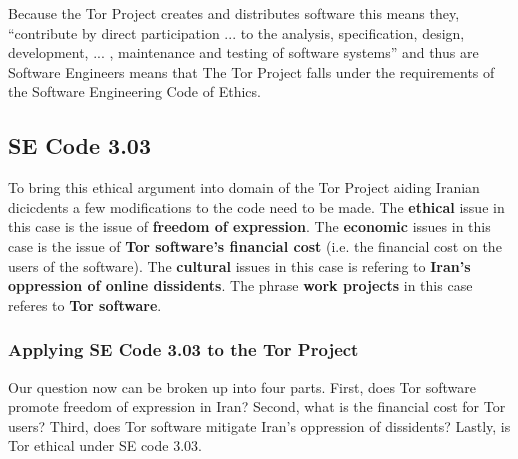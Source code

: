 \documentclass[11pt]{article}
\begin{document}
\begin{multicols}{2}
Because the Tor Project creates and distributes
software this means they, ``contribute by direct participation ...  to the
analysis, specification, design, development, ... , maintenance and testing of
software systems'' and thus are Software Engineers means that The Tor Project
falls under the requirements of the Software Engineering Code of
Ethics.\cite{Tor:FAQ, Tor:Overview} 


\subsection{SE Code 3.03}

\newline

To bring this ethical argument into domain of the Tor Project
aiding Iranian dicicdents a few modifications to the code need to be made. The
\textbf{ethical} issue in this case is the issue of \textbf{freedom of
expression}. The \textbf{economic} issues in this case is the issue of
\textbf{Tor software's financial cost} (i.e. the financial cost on the users of
the software). The \textbf{cultural} issues in this case is refering to
\textbf{Iran's oppression of online dissidents}. The phrase \textbf{work projects} in
this case referes to \textbf{Tor software}.


\subsubsection{Applying SE Code 3.03 to the Tor Project}

\newline

Our question now can be broken up into four parts. First, does Tor software
promote freedom of expression in Iran? Second, what is the financial cost for
Tor users?  Third, does Tor software mitigate Iran's oppression of dissidents?
Lastly, is Tor ethical under SE code 3.03.


\end{multicols}
\end{document}
